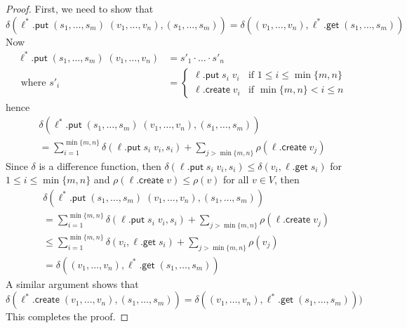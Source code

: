\documentclass[acmsmall,review,anonymous]{acmart}\settopmatter{printfolios=true,printccs=false,printacmref=false}
\newcommand{\kw}[1]{\ensuremath{\mathsf{#1}}}
\newcommand{\get}{\ensuremath{\kw{get}}}
\newcommand{\pput}{\ensuremath{\kw{put}}}
\newcommand{\create}{\ensuremath{\kw{create}}}
\begin{document}
\begin{proof}
First, we need to show that
\begin{equation}\label{positionalputexact}
\delta(\ell^*.\pput \; (s_1, \ldots, s_m) \; (v_1, \ldots, v_n),
(s_1, \ldots, s_m)) = \delta((v_1, \ldots, v_n), \ell^*.\get \; (s_1, \ldots,
s_m))
\end{equation}
Now
\begin{align*}
\ell^* .\pput \; (s_1, \ldots, s_m) \; (v_1, \ldots, v_n) &= s'_1 \cdot \ldots
\cdot s'_n\\
\text{ where } s'_i &= \begin{cases}
\ell.\pput \; s_i \; v_i & \text{if } 1 \leq i \leq \min\{m, n\}\\
\ell.\create \; v_i & \text{if } \min\{m, n\} < i \leq n
\end{cases}
\end{align*}
hence
\begin{multline}\label{positionalleft}
\delta(\ell^* .\pput \; (s_1, \ldots, s_m) \; (v_1, \ldots, v_n), (s_1,
\ldots, s_m))\\ = \sum_{i=1}^{\min\{m, n\}} \delta(\ell.\pput \; s_i \; v_i,
s_i) + \sum_{j > \min\{m, n\}} \rho(\ell.\create \; v_j)
\end{multline}
Since $\delta$ is a difference function, then $\delta(\ell.\pput \; s_i \;
v_i, s_i) \leq \delta(v_i, \ell.\get \; s_i)$ for $1 \leq i \leq \min\{m,n\}$
and $\rho(\ell.\create \; v) \leq \rho(v)$ for all $v \in V$, then
\begin{align*}
&\delta(\ell^* .\pput \; (s_1, \ldots, s_m) \; (v_1, \ldots, v_n), (s_1,
\ldots, s_m))\\ 
&=\sum_{i=1}^{\min\{m, n\}} \delta(\ell.\pput \; s_i \; v_i, s_i) + \sum_{j >
\min\{m, n\}} \rho(\ell.\create \; v_j)\\
&\leq \sum_{i=1}^{\min\{m, n\}} \delta(v_i,
\ell.\get \; s_i) + \sum_{j > \min\{m, n\}} \rho(v_j)\\
&= \delta((v_1, \ldots, v_n), \ell^*.\get \; (s_1, \ldots, s_m))
\end{align*}
A similar argument shows that 
$$\delta(\ell^*.\create \; (v_1, \ldots, v_n), (s_1, \ldots, s_m))
=  \delta((v_1, \ldots, v_n), \ell^*.\get \; (s_1, \ldots, s_m)))
$$
This completes the proof.
\end{proof}
\end{document}
